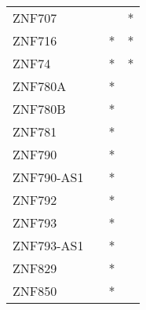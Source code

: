 \begin{longtable}{lccc}
ZNF707       &           &     &       * \\
ZNF716       &           &   * &       * \\
ZNF74        &           &   * &       * \\
ZNF780A      &           &   * &         \\
ZNF780B      &           &   * &         \\
ZNF781       &           &   * &         \\
ZNF790       &           &   * &         \\
ZNF790-AS1   &           &   * &         \\
ZNF792       &           &   * &         \\
ZNF793       &           &   * &         \\
ZNF793-AS1   &           &   * &         \\
ZNF829       &           &   * &         \\
ZNF850       &           &   * &         \\
\end{longtable}
